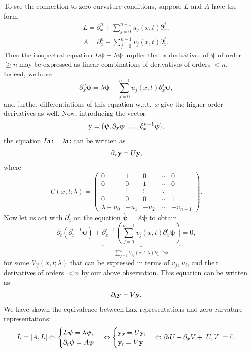 \begin{example}
    To see the connection to zero curvature conditions, suppose $L$ and $A$ have the form 
    \begin{align}
        L=\partial_x^n+\sum_{j=0}^{n-1}u_j(x,t)\partial_x^j,\\
        A=\partial_x^n+\sum_{j=0}^{n-1}v_j(x,t)\partial_x^j.
    \end{align}
    Then the isospectral equation $L\bm{\psi}=\lambda\bm{\psi}$ implies that $x$-derivatives of $\bm{\psi}$ of order $\geq n$ may be expressed as linear combinations of derivatives of orders $<n$. Indeed, we have
    \[\partial_x^n\bm{\psi}=\lambda\bm{\psi}-\sum_{j=0}^{n-1}u_j(x,t)\partial_x^j\bm{\psi},\]
    and further differentiations of this equation w.r.t.\ $x$ give the higher-order derivatives as well. Now, introducing the vector 
    \[\bf{y}=(\bm{\psi},\partial_x\bm{\psi},\ldots,\partial_x^{n-1}\bm{\psi}),\]
    the equation $L\bm{\psi}=\lambda\bm{\psi}$ can be written as 
    \[\partial_x\bf{y}=U\bf{y},\]
    where 
    \[U(x,t;\lambda)=
    \begin{pmatrix}
        0 & 1 & 0 & \cdots & 0\\
        0 & 0 & 1 & \cdots & 0\\
        \vdots & \vdots & \vdots & \ddots & \vdots \\
        0 & 0 & 0 & \cdots & 1\\
        \lambda-u_0 & -u_1 & -u_2 & \cdots & -u_{n-1}
    \end{pmatrix}.
    \]
    Now let us act with $\partial_x^i$ on the equation $\dot{\bm{\psi}}=A\bm{\psi}$ to obtain 
    \[\partial_t(\partial_x^{i-1}\bm{\psi})+\underbrace{\partial_x^{i-1}\left(\sum_{j=0}^{m-1}v_j(x,t)\partial_x^i\bm{\psi}\right)}_{\sum_{j=1}^nV_{ij}(x,t;\lambda)\partial_x^{j-1}\bm{\psi}}=0,\]
    for some $V_{ij}(x,t;\lambda)$ that can be expressed in terms of $v_j$, $u_i$, and their derivatives of orders $<n$ by our above observation. This equation can be written as 
    \[\partial_t \bf{y}=V\bf{y}.\]
    We have shown the equivalence between Lax representations and zero curvature representations:
    \[
    \dot L=[A,L]\Leftrightarrow 
    \begin{cases}
        L\bm{\psi}=\lambda\bm{\psi},\\
        \partial_t\bm{\psi}=A\bm{\psi}
    \end{cases}\Leftrightarrow
    \begin{cases}
        \bf{y}_x=U\bf{y},\\
        \bf{y}_t=V\bf{y}
    \end{cases}\Leftrightarrow
    \partial_t U-\partial_x V+[U,V]=0.
    \]
\end{example}

